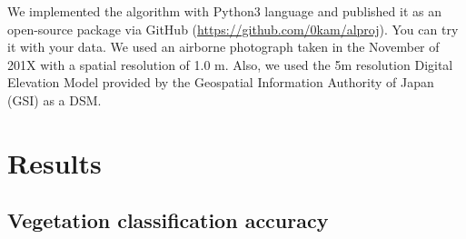\documentclass{article}
\begin{document}
We implemented the algorithm with Python3 language and published it as
an open-source package via GitHub
(\url{https://github.com/0kam/alproj}). You can try it with your data.
We used an airborne photograph taken in the November of 201X with a
spatial resolution of 1.0 m. Also, we used the 5m resolution Digital
Elevation Model provided by the Geospatial Information Authority of
Japan (GSI) as a DSM.

\hypertarget{results}{%
\section{Results}\label{results}}

\hypertarget{vegetation-classification-accuracy}{%
\subsection{Vegetation classification
accuracy}\label{vegetation-classification-accuracy}}
\end{document}
